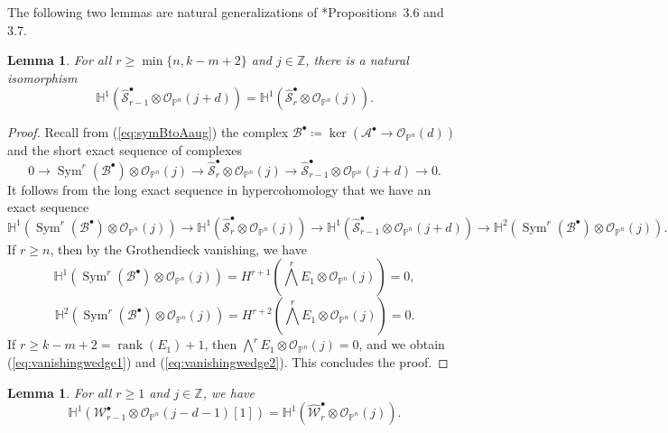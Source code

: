 \documentclass[11pt,letterpaper,reqno]{amsart}
\newcommand{\rk}{\operatorname{rank}}
\newcommand{\Sym}{\operatorname{Sym}}
\renewcommand{\ker}{\operatorname{ker}}
\newcommand{\bb}[1]{\mathbb{#1}}
\newcommand{\mc}[1]{\mathcal{#1}}
\def\PP{{\mathbb P}}
\def\lra{\longrightarrow}
\newtheorem{lemma}[theorem]{Lemma}
\theoremstyle{definition}
\numberwithin{equation}{section}
\begin{document}
\noindent
The following two lemmas are natural generalizations of \cite{RSWY}*{Propositions~3.6 and 3.7}.
\begin{lemma}\label{lem:H1ladderS}
    For all $r \ge \min\{n,k-m+2\}$ and $j \in \bb{Z}$, there is a natural isomorphism
    \[\mathbb{H}^{1}(\widehat{\mc{S}}^\bullet_{r-1} \otimes \mc{O}_{\PP^n}(j + d)) = \mathbb{H}^{1}(\widehat{\mc{S}}^\bullet_{r} \otimes \mc{O}_{\PP^n}(j )).\]
\end{lemma}
\begin{proof}
    Recall from (\ref{eq:symBtoAaug}) the complex $\mc{B}^\bullet \coloneqq \ker(\mc{A}^\bullet \lra \mc{O}_{\PP^n}(d))$ and the short exact sequence of complexes
    \[0 \lra \Sym^r(\mc{B}^\bullet) \otimes \mc{O}_{\PP^n}(j )\lra \widehat{\mc{S}}^\bullet_{r} \otimes \mc{O}_{\PP^n}(j )\lra \widehat{\mc{S}}^\bullet_{r-1} \otimes \mc{O}_{\PP^n}(j+d) \lra 0.\]
    It follows from the long exact sequence in hypercohomology that we have an exact sequence
    \[ \mathbb{H}^{1}(\Sym^r(\mc{B}^\bullet)\otimes \mc{O}_{\PP^n}(j )) \lra  \mathbb{H}^{1}(\widehat{\mc{S}}^\bullet_{r}\otimes \mc{O}_{\PP^n}(j )) \lra  \mathbb{H}^{1}(\widehat{\mc{S}}^\bullet_{r-1} \otimes \mc{O}_{\PP^n}(j+d)) \lra  \mathbb{H}^{2}(\Sym^r(\mc{B}^\bullet)\otimes \mc{O}_{\PP^n}(j )).\]
    If $r \ge n$, then by the Grothendieck vanishing, we have
    \begin{equation}\label{eq:vanishingwedge1}
        \mathbb{H}^{1}(\Sym^r(\mc{B}^\bullet)\otimes \mc{O}_{\PP^n}(j )) = H^{r+1}\left( \bigwedge^r E_1\otimes \mc{O}_{\PP^n}(j )\right) = 0,
    \end{equation}
    \begin{equation}\label{eq:vanishingwedge2}
        \mathbb{H}^{2}(\Sym^r(\mc{B}^\bullet)\otimes \mc{O}_{\PP^n}(j )) = H^{r+2}\left( \bigwedge^r E_1\otimes \mc{O}_{\PP^n}(j )\right) = 0.
    \end{equation}
    If $r \ge k-m+2 = \rk(E_1)+1$, then $\bigwedge^r E_1 \otimes \mc{O}_{\PP^n}(j )= 0$, and we obtain (\ref{eq:vanishingwedge1}) and (\ref{eq:vanishingwedge2}). This concludes the proof.
\end{proof}
\begin{lemma}\label{lem:H1ladderW}
    For all $r \ge 1$ and $j \in \bb{Z}$, we have
    \[\bb{H}^1({\mc{W}}^\bullet_{r-1} \otimes \mc{O}_{\PP^n}(j-d-1)[1]) = \bb{H}^1(\widehat{\mc{W}}^\bullet_{r} \otimes \mc{O}_{\PP^n}(j)).\]
\end{lemma}
\end{document}
